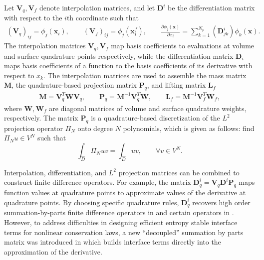 \documentclass{svjour3}                     %
\renewcommand{\hat}{\widehat}
\newcommand{\pd}[2]{\frac{\partial#1}{\partial#2}}
\newcommand{\LRp}[1]{\left( #1 \right)}
\begin{document}
Let $\bm{V}_q,\bm{V}_f$ denote interpolation matrices, and let $\bm{D}^i$ be the differentiation matrix with respect to the $i$th coordinate such that
\begin{gather}
\LRp{\bm{V}_q}_{ij} = \phi_j(\bm{x}_i), \qquad \LRp{\bm{V}_f}_{ij} = \phi_j(\bm{x}^f_i), \qquad \pd{\phi_j(\bm{x})}{x_i} = \sum_{k=1}^{N_p} \LRp{\bm{D}^i_{jk}} \phi_k(\bm{x}).
\end{gather}
The interpolation matrices $\bm{V}_q,\bm{V}_f$ map basis coefficients to evaluations at volume and surface quadrature points respectively, while the differentiation matrix ${\bm{D}}_i$ maps basis coefficients of a function to the basis coefficients of its derivative with respect to $x_k$.  The interpolation matrices are used to assemble the mass matrix $\bm{M}$, the quadrature-based projection matrix $\bm{P}_q$, and lifting matrix $\bm{L}_f$
\begin{gather}
\bm{M} = \bm{V}_q^T\bm{W}\bm{V}_q, \qquad \bm{P}_q = \bm{M}^{-1}\bm{V}_q^T\bm{W}, \qquad \bm{L}_f = \bm{M}^{-1}\bm{V}_f^T\bm{W}_f,
\end{gather}
where $\bm{W}, \bm{W}_f$ are diagonal matrices of volume and surface quadrature weights, respectively.  The matrix $\bm{P}_q$ is a quadrature-based discretization of the $L^2$ projection operator $\Pi_N$ onto degree $N$ polynomials, which is given as follows: find $\Pi_N u \in V^N$ such that
\begin{equation}
\int_{\hat{D}} \Pi_N u v = \int_{\hat{D}} u v, \qquad \forall v \in V^N.
\label{eq:l2proj}
\end{equation}

Interpolation, differentiation, and $L^2$ projection matrices can be combined to construct finite difference operators.  For example, the matrix $\bm{D}^i_q = \bm{V}_q\bm{D}^i\bm{P}_q$ maps function values at quadrature points to approximate values of the derivative at quadrature points.  By choosing specific quadrature rules, $\bm{D}^i_q$ recovers high order summation-by-parts finite difference operators in \cite{gassner2013skew, fernandez2014generalized, ranocha2018generalised} and certain operators in \cite{hicken2016multidimensional}.  However, to address difficulties in designing efficient entropy stable interface terms for nonlinear conservation laws, a new ``decoupled'' summation by parts matrix was introduced in \cite{chan2017discretely} which builds interface terms directly into the approximation of the derivative.  
\end{document}
